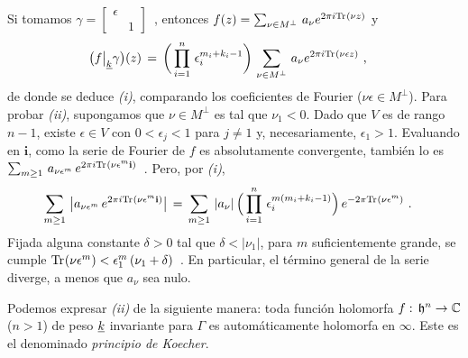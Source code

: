 Si tomamos
\begin{math}
	\gamma=\begin{bmatrix} \epsilon & \\ & 1\end{bmatrix}
\end{math}~,
entonces
\begin{math}
	f(z)=\sum_{\nu\in M^{\perp}}\,a_{\nu}e^{2\pi i\mathrm{Tr}_{}(\nu z)}
\end{math}
y
\begin{align*}
	\big(f\big|_{\underline{k}}{\gamma}\big) (z) & \,=\,
		\bigg(\prod_{i=1}^{n}\,\epsilon_{i}^{m_{i}+k_{i}-1}\bigg)\,
		\sum_{\nu\in M^{\perp}}\,a_{\nu}e^{2\pi i\mathrm{Tr}_{}(\nu\epsilon z)}
	\text{ ,}
\end{align*}
%
de donde se deduce \textit{(i)}, comparando los coeficientes de Fourier
($\nu\epsilon\in M^{\perp}$). Para probar \textit{(ii)}, supongamos que
$\nu\in M^{\perp}$ es tal que $\nu_{1}<0$. Dado que $V$ es de rango $n-1$,
existe $\epsilon\in V$ con $0<\epsilon_{j}<1$ para $j\not =1$ y,
necesariamente, $\epsilon_{1}>1$. Evaluando en $\mathbf{i}$, como la serie de
Fourier de $f$ es absolutamente convergente, tambi\'{e}n lo es
\begin{math}
	\sum_{m\geq 1}\,a_{\nu\epsilon^{m}}\,
		e^{2\pi i\mathrm{Tr}_{}(\nu\epsilon^{m}\mathbf{i})}
\end{math}~.
Pero, por \textit{(i)},
\begin{align*}
	\sum_{m\geq 1}\,\big|a_{\nu\epsilon^{m}}\,
		e^{2\pi i\mathrm{Tr}_{}(\nu\epsilon^{m}\mathbf{i})}\big|
		& \,=\, \sum_{m\geq 1}\,|a_{\nu}|\,
		\Big(\prod_{i=1}^{n}\,\epsilon_{i}^{m(m_{i}+k_{i}-1)}\Big)\,
			e^{-2\pi\mathrm{Tr}_{}(\nu\epsilon^{m})}
	\text{ .}
\end{align*}
%
Fijada alguna constante $\delta>0$ tal que $\delta<|\nu_{1}|$, para $m$
suficientemente grande, se cumple
\begin{math}
	\mathrm{Tr}_{}(\nu\epsilon^{m})<\epsilon_{1}^{m}\,(\nu_{1}+\delta)
\end{math}~.
En particular, el t\'{e}rmino general de la serie diverge, a menos que
$a_{\nu}$ sea nulo.

\begin{obsPrincipioDeKoecher}
	\label{obs:principiodekoecher}
	Podemos expresar \textit{(ii)} de la siguiente manera: toda funci\'{o}n
	holomorfa $f:\,\mathfrak{h}^{n}\rightarrow\mathbb{C}$ ($n>1$) de peso $\underline{k}$
	invariante para $\Gamma$ es autom\'{a}ticamente holomorfa en $\infty$.
	Este es el denominado \emph{principio de Koecher}.
\end{obsPrincipioDeKoecher}

